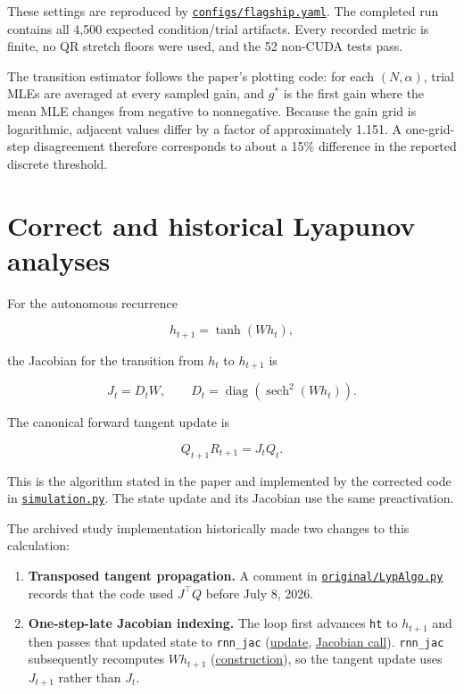 \documentclass[11pt]{article}
\begin{document}
These settings are reproduced by
\href{configs/flagship.yaml}{\texttt{configs/flagship.yaml}}. The completed run contains all
4,500 expected condition/trial artifacts. Every recorded metric is finite, no
QR stretch floors were used, and the 52 non-CUDA tests pass.

The transition estimator follows the paper's plotting code: for each
$(N,\alpha)$, trial MLEs are averaged at every sampled gain, and $g^*$ is the
first gain where the mean MLE changes from negative to nonnegative. Because the
gain grid is logarithmic, adjacent values differ by a factor of approximately
1.151. A one-grid-step disagreement therefore corresponds to about a 15\%
difference in the reported discrete threshold.

\section{Correct and historical Lyapunov analyses}

For the autonomous recurrence

\[
h_{t+1}=\tanh(W h_t),
\]

the Jacobian for the transition from $h_t$ to $h_{t+1}$ is

\[
J_t=D_tW,
\qquad
D_t=\operatorname{diag}\!\left(\operatorname{sech}^2(W h_t)\right).
\]

The canonical forward tangent update is

\[
Q_{t+1}R_{t+1}=J_tQ_t.
\]

This is the algorithm stated in the paper and implemented by the corrected
code in \href{simulation.py\#L134-L141}{\texttt{simulation.py}}. The state update and its
Jacobian use the same preactivation.

The archived study implementation historically made two changes to this
calculation:

\begin{enumerate}
\item \textbf{Transposed tangent propagation.} A comment in
\href{original/LypAlgo.py\#L9-L12}{\texttt{original/LypAlgo.py}} records that the code used
$J^\top Q$ before July 8, 2026.
\item \textbf{One-step-late Jacobian indexing.} The loop first advances \texttt{ht} to
$h_{t+1}$ and then passes that updated state to \texttt{rnn\_jac}
(\href{original/LypAlgo.py\#L80-L84}{update},
\href{original/LypAlgo.py\#L96-L100}{Jacobian call}). \texttt{rnn\_jac} subsequently
recomputes $W h_{t+1}$ (\href{original/LypAlgo.py\#L138-L162}{construction}), so
the tangent update uses $J_{t+1}$ rather than $J_t$.
\end{enumerate}
\end{document}
